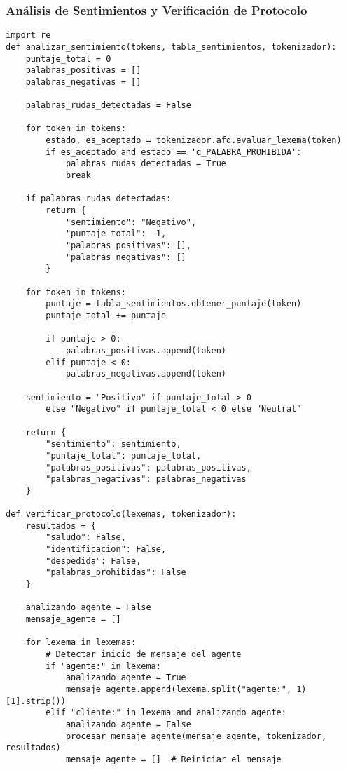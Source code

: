 \documentclass[12pt,a4paper]{article}
\begin{document}
\subsubsection{ Análisis de Sentimientos y Verificación de Protocolo}
\begin{verbatim}
import re
def analizar_sentimiento(tokens, tabla_sentimientos, tokenizador):
    puntaje_total = 0
    palabras_positivas = []
    palabras_negativas = []

    palabras_rudas_detectadas = False

    for token in tokens:
        estado, es_aceptado = tokenizador.afd.evaluar_lexema(token)
        if es_aceptado and estado == 'q_PALABRA_PROHIBIDA':
            palabras_rudas_detectadas = True
            break 

    if palabras_rudas_detectadas:
        return {
            "sentimiento": "Negativo",
            "puntaje_total": -1,
            "palabras_positivas": [],
            "palabras_negativas": []
        }
    
    for token in tokens:
        puntaje = tabla_sentimientos.obtener_puntaje(token)
        puntaje_total += puntaje

        if puntaje > 0:
            palabras_positivas.append(token)
        elif puntaje < 0:
            palabras_negativas.append(token)
    
    sentimiento = "Positivo" if puntaje_total > 0 
        else "Negativo" if puntaje_total < 0 else "Neutral"
    
    return {
        "sentimiento": sentimiento,
        "puntaje_total": puntaje_total,
        "palabras_positivas": palabras_positivas,
        "palabras_negativas": palabras_negativas
    }

def verificar_protocolo(lexemas, tokenizador):
    resultados = {
        "saludo": False,
        "identificacion": False,
        "despedida": False,
        "palabras_prohibidas": False
    }

    analizando_agente = False
    mensaje_agente = []

    for lexema in lexemas:
        # Detectar inicio de mensaje del agente
        if "agente:" in lexema:
            analizando_agente = True
            mensaje_agente.append(lexema.split("agente:", 1)[1].strip())
        elif "cliente:" in lexema and analizando_agente:
            analizando_agente = False
            procesar_mensaje_agente(mensaje_agente, tokenizador, resultados)
            mensaje_agente = []  # Reiniciar el mensaje


\end{verbatim}
\end{document}
